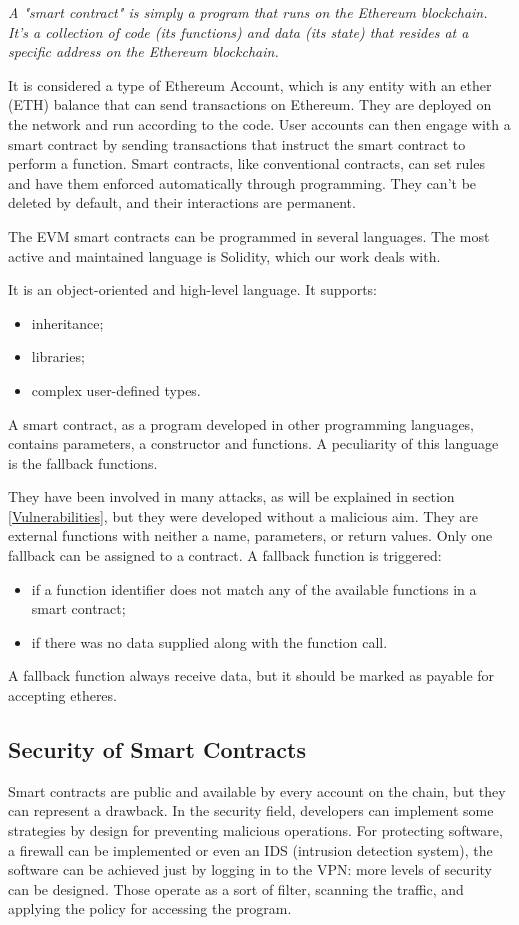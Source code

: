 \documentclass[a4paper,sigconf, language=french,
language=german, language=spanish, language=english]{acmart}
\begin{document}
\textit{A "smart contract" is simply a program that runs on the Ethereum blockchain. It's a collection of code (its functions) and data (its state) that resides at a specific address on the Ethereum blockchain.}

It is considered a type of Ethereum Account, which is any entity with an ether (ETH) balance that can send transactions on Ethereum. 
They are deployed on the network and run according to the code. User accounts can then engage with a smart contract by sending transactions that instruct the smart contract to perform a function. 
Smart contracts, like conventional contracts, can set rules and have them enforced automatically through programming.
They can't be deleted by default, and their interactions are permanent. 

The EVM smart contracts can be programmed in several languages. The most active and maintained language is Solidity, which our work deals with. 

It is an object-oriented and high-level language. It supports:
\begin{itemize}
  \item inheritance;
  \item libraries;
  \item complex user-defined types.
\end{itemize}

A smart contract, as a program developed in other programming languages, contains parameters, a constructor and functions. A peculiarity of this language is the fallback functions. 

They have been involved in many attacks, as will be explained in section \ref{Vulnerabilities}, but they were developed without a malicious aim. 
They are external functions with neither a name, parameters, or return values. Only one fallback can be assigned to a contract. 
A fallback function is triggered:
\begin{itemize}
  \item if a function identifier does not match any of the available functions in a smart contract;
  \item if there was no data supplied along with the function call.
\end{itemize}

A fallback function always receive data, but it should be marked as payable for accepting etheres. 


\subsection{Security of Smart Contracts}
Smart contracts are public and available by every account on the chain, but they can represent a drawback. In the security field, developers can implement some strategies by design for preventing malicious operations. For protecting software, a firewall can be implemented or even an IDS (intrusion detection system), the software can be achieved just by logging in to the VPN: more levels of security can be designed.
Those operate as a sort of filter, scanning the traffic, and applying the policy for accessing the program. 
\end{document}
